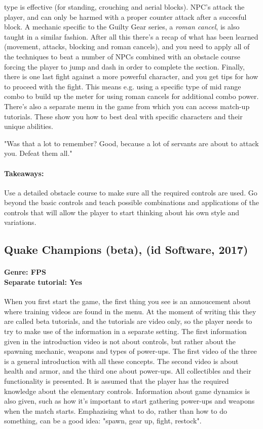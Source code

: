 type is effective (for standing, crouching and aerial blocks). NPC's attack
the player, and can only be harmed with a proper counter attack after a
succesful block. A mechanic specific to the Guilty Gear series, a \textit{roman cancel}, is also taught in a similar fashion.
After all this there's a recap of what has been learned (movement, attacks,
blocking and roman cancels), and you need to apply all of the techniques to
beat a number of NPCs combined with an obstacle course forcing the player to
jump and dash in order to complete the section. Finally, there is one last
fight against a more powerful character, and you get tips for how to proceed
with the fight. This means e.g. using a specific type of mid range combo to
build up the meter for using roman cancels for additional combo power.
There's also a separate menu in the game from which you can access match-up
tutorials. These show you how to best deal with specific characters and their
unique abilities.

"Was that a lot to remember?
Good, because a lot of servants are about to attack you.
Defeat them all."
\paragraph{Takeaways:}
Use a detailed obstacle course to make sure all the required controls are used.
Go beyond the basic controls and teach possible combinations and applications of the controls that will allow the player to start thinking about his own style and variations.

\subsection{Quake Champions (beta), (id Software, 2017)}
\paragraph{Genre: FPS \\ Separate tutorial: Yes \\}
When you first start the game, the first thing you see is an annoucement about
where training videos are found in the menu. At the moment of writing this
they are called beta tutorials, and the tutorials are video only, so the
player needs to try to make use of the information in a separate setting. The
first information given in the introduction video is not about controls, but
rather about the spawning mechanic, weapons and types of power-ups. The first
video of the three is a general introduction with all these concepts. The
second video is about health and armor, and the third one about power-ups.
All collectibles and their functionality is presented. It is assumed that the
player has the required knowledge about the elementary controls. Information about game dynamics is also given, such as how it's important to start gathering power-ups and weapons when the match starts. Emphazising what to do, rather than how to do something, can be a good idea: "spawn, gear up, fight, restock".
